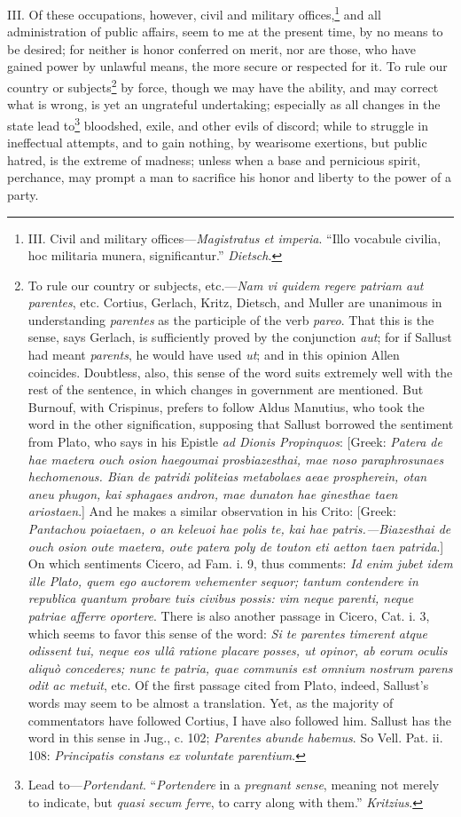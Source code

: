 III. Of these occupations, however, civil and military offices,\footnote{III. Civil and military offices—\emph{Magistratus et imperia}.
``Illo vocabule civilia, hoc militaria munera, significantur.''
\emph{Dietsch}.} and
all administration of public affairs, seem to me at the present time,
by no means to be desired; for neither is honor conferred on merit,
nor are those, who have gained power by unlawful means, the more
secure or respected for it. To rule our country or subjects\footnote{To rule our country or subjects, etc.—\emph{Nam vi quidem regere
patriam aut parentes}, etc. Cortius, Gerlach, Kritz, Dietsch, and
Muller are unanimous in understanding \emph{parentes} as the participle of
the verb \emph{pareo}. That this is the sense, says Gerlach, is
sufficiently proved by the conjunction \emph{aut}; for if Sallust had meant
\emph{parents}, he would have used \emph{ut}; and in this opinion Allen
coincides. Doubtless, also, this sense of the word suits extremely
well with the rest of the sentence, in which changes in government are
mentioned. But Burnouf, with Crispinus, prefers to follow Aldus
Manutius, who took the word in the other signification, supposing that
Sallust borrowed the sentiment from Plato, who says in his Epistle \emph{ad
Dionis Propinquos}: [Greek: \emph{Patera de hae maetera ouch osion
haegoumai prosbiazesthai, mae noso paraphrosunaes hechomenous. Bian de
patridi politeias metabolaes aeae prospherein, otan aneu phugon, kai
sphagaes andron, mae dunaton hae ginesthae taen ariostaen}.] And he
makes a similar observation in his Crito: [Greek: \emph{Pantachou
poiaetaen, o an keleuoi hae polis te, kai hae patris.—Biazesthai de
ouch osion oute maetera, oute patera poly de touton eti aetton taen
patrida}.] On which sentiments Cicero, ad Fam. i. 9, thus comments:
\emph{Id enim jubet idem ille Plato, quem ego auctorem vehementer sequor;
tantum contendere in republica quantum probare tuis civibus possis:
vim neque parenti, neque patriae afferre oportere}. There is also
another passage in Cicero, Cat. i. 3, which seems to favor this sense
of the word: \emph{Si te parentes timerent atque odissent tui, neque eos
ullâ ratione placare posses, ut opinor, ab eorum oculis aliquò
concederes; nunc te patria, quae communis est omnium nostrum parens
odit ac metuit}, etc. Of the first passage cited from Plato, indeed,
Sallust's words may seem to be almost a translation. Yet, as the
majority of commentators have followed Cortius, I have also followed
him. Sallust has the word in this sense in Jug., c. 102; \emph{Parentes
abunde habemus}. So Vell. Pat. ii. 108: \emph{Principatis constans ex
voluntate parentium}.} by
force, though we may have the ability, and may correct what is wrong,
is yet an ungrateful undertaking; especially as all changes in the
state lead to\footnote{Lead to—\emph{Portendant}. ``\emph{Portendere} in a \emph{pregnant sense},
meaning not merely to indicate, but \emph{quasi secum ferre}, to carry
along with them.'' \emph{Kritzius}.} bloodshed, exile, and other evils of discord; while
to struggle in ineffectual attempts, and to gain nothing, by wearisome
exertions, but public hatred, is the extreme of madness; unless when a
base and pernicious spirit, perchance, may prompt a man to sacrifice
his honor and liberty to the power of a party.

